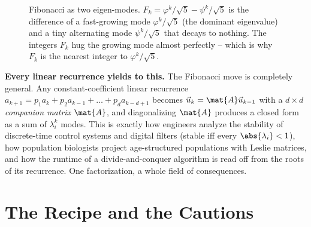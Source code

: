 \begin{figure}[H]
\centering
{}
\caption{Fibonacci as two eigen-modes. $F_k = \varphi^k/\sqrt5 - \psi^k/\sqrt5$ is
the difference of a fast-growing mode $\varphi^k/\sqrt5$ (the dominant
eigenvalue) and a tiny alternating mode $\psi^k/\sqrt5$ that decays to nothing.
The integers $F_k$ hug the growing mode almost perfectly -- which is why $F_k$ is
the nearest integer to $\varphi^k/\sqrt5$.}
\label{ch24:fig-fibmodes}
\end{figure}

\begin{applicationbox}
\textbf{Every linear recurrence yields to this.} The Fibonacci move is completely
general. Any constant-coefficient linear recurrence
$a_{k+1} = p_1 a_k + p_2 a_{k-1} + \dots + p_d a_{k-d+1}$ becomes
$\vec{u}_k = \mat{A}\vec{u}_{k-1}$ with a $d\times d$ \emph{companion matrix}
$\mat{A}$, and diagonalizing $\mat{A}$ produces a closed form as a sum of
$\lambda_i^k$ modes. This is exactly how engineers analyze the stability of
discrete-time control systems and digital filters (stable iff every
$\abs{\lambda_i}<1$), how population biologists project age-structured
populations with Leslie matrices, and how the runtime of a divide-and-conquer
algorithm is read off from the roots of its recurrence. One factorization, a
whole field of consequences.
\end{applicationbox}

\section{The Recipe and the Cautions}
\label{ch24:recipe}


